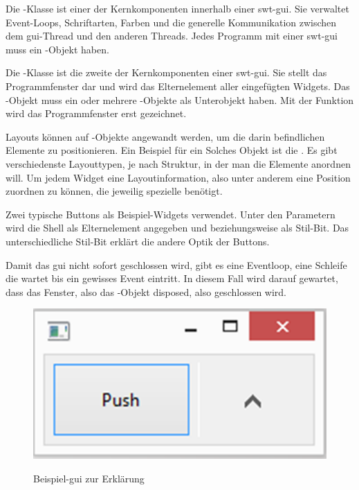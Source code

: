\begin{description}
    Die -Klasse ist einer der Kernkomponenten innerhalb einer \acrshort{swt}-\acrshort{gui}.
    Sie verwaltet Event-Loops, Schriftarten, Farben und die generelle Kommunikation zwischen dem \acrshort{gui}-Thread
    und den anderen Threads. Jedes Programm mit einer \acrshort{swt}-\acrshort{gui} muss ein -Objekt haben.

    Die -Klasse ist die zweite der Kernkomponenten einer \acrshort{swt}-\acrshort{gui}.
    Sie stellt das Programmfenster dar und wird das Elternelement aller eingefügten Widgets.
		Das -Objekt muss ein oder mehrere -Objekte als Unterobjekt haben.
    Mit der Funktion  wird das Programmfenster erst gezeichnet.

    Layouts können auf -Objekte angewandt werden, um die darin befindlichen
		Elemente zu positionieren. Ein Beispiel für ein Solches Objekt ist die .
    Es gibt verschiedenste Layouttypen, je nach Struktur, in der man die Elemente anordnen will.
    Um jedem Widget eine Layoutinformation, also unter anderem eine Position zuordnen zu können,
		die jeweilig spezielle  benötigt.

    Zwei typische Buttons als Beispiel-Widgets verwendet. Unter den Parametern wird die Shell als
    Elternelement angegeben und  beziehungsweise 
    als Stil-Bit. Das unterschiedliche Stil-Bit erklärt die andere Optik der Buttons.

    Damit das \acrshort{gui} nicht sofort geschlossen wird, gibt es eine Eventloop,
		eine Schleife die wartet bis ein gewisses Event eintritt. In diesem Fall wird
		darauf gewartet, dass das Fenster, also das -Objekt disposed, also
		geschlossen wird.

\end{description}

\begin{figure}[htb]
	\centering
	\includegraphics[]{images/erklaerungsgui.png}
	\label{erklaerungsgui}
  \caption{Beispiel-\acrshort{gui} zur Erklärung}
\end{figure}

